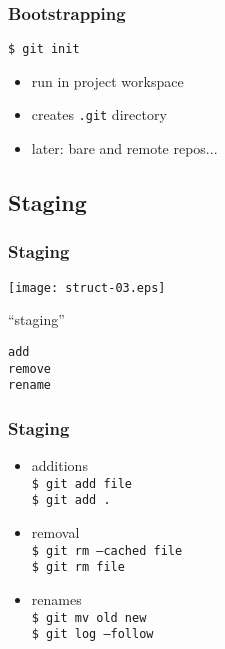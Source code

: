 \documentclass[english]{beamer}
\newcommand{\mysubsection}[2]{%
  \hypertarget{#2}{}%
  \subsection{#1}%
  \label{#2}%
}
\newcommand{\CMD}[1]{%
\texttt{\textcolor{code-green}{#1}}%
}
\begin{document}
\begin{frame}
\frametitle{Bootstrapping}

\CMD{\$ git init} \\
\begin{itemize}
        \item run in project workspace
        \item creates \CMD{.git} directory
        \vspace{.1\textheight}
        \item later: bare and remote repos...
\end{itemize}
\end{frame}

\mysubsection{Staging}{using:staging}
\begin{frame}
\frametitle{Staging}

\texttt{[image: struct-03.eps]}
\vspace{\baselineskip}
\begin{center}
        ``staging''

        \vspace{\baselineskip}
        \CMD{add} \\
        \CMD{remove} \\
        \CMD{rename}
\end{center}
\vspace{\textheight}
\end{frame}

\begin{frame}
\frametitle{Staging}

\vspace{.1\textheight}

\begin{itemize}
        \item additions \\
                \CMD{\$ git add file} \\
                \CMD{\$ git add .} \\
                \vspace{.1\textheight}
        \item removal \\
                \CMD{\$ git rm --cached file} \\
                \CMD{\$ git rm file}
                \vspace{.1\textheight}
        \item renames \\
                \CMD{\$ git mv old new} \\
                \CMD{\$ git log --follow}
\end{itemize}
\end{frame}
\end{document}
